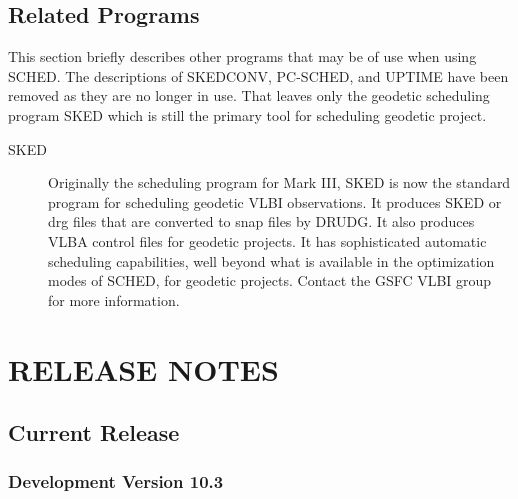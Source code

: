 \documentclass{report}
\newcommand{\sched}{{\sc SCHED}}
\begin{document}
\section{\label{SEC:RELATEDPROGRAMS}Related Programs}

This section briefly describes other programs that may be of use when
using \sched.  The descriptions of {\sc SKEDCONV}, {\sc PC-SCHED}, and
{\sc UPTIME} have been removed as they are no longer in use.  That leaves
only the geodetic scheduling program {\sc SKED} which is still the
primary tool for scheduling geodetic project.

\begin{description}

\item [{\sc SKED}] Originally the scheduling program for Mark III,
{\sc SKED} is now the standard program for scheduling geodetic VLBI
observations.  It produces {\sc SKED} or drg files that are converted
to snap files by {\sc DRUDG}.  It also produces VLBA control files for
geodetic projects.  It has sophisticated automatic scheduling
capabilities, well beyond what is available in the optimization modes
of \sched, for geodetic projects.  Contact the GSFC VLBI group for
more information.


\end{description}

\chapter{\label{CHP:CHANG}RELEASE NOTES}


\section{\label{SEC:CURRENT}Current Release}


\subsection{\label{SSEC:VER_10.3}Development Version 10.3}
\end{document}
